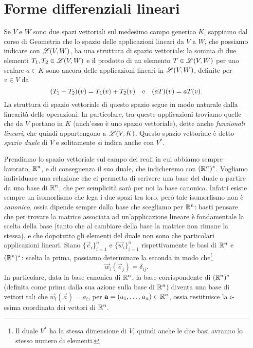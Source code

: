 \section{Forme differenziali lineari}
Se $V$ e $W$ sono due spazi vettoriali sul medesimo campo generico $K$, sappiamo dal corso di Geometria che lo spazio delle applicazioni lineari da $V$ a $W$, che possiamo indicare con $\mathscr L(V,W)$, ha una struttura di spazio vettoriale: la somma di due elementi $T_1,T_2\in\mathscr L(V,W)$ e il prodotto di un elemento $T\in\mathscr L(V,W)$ per uno scalare $a\in K$ sono ancora delle applicazioni lineari in $\mathscr L(V,W)$, definite per $v\in V$ da
\begin{equation*}
	(T_1+T_2)(v)=T_1(v)+T_2(v)\quad\text{e}\quad (aT)(v)=aT(v).
\end{equation*}
La struttura di spazio vettoriale di questo spazio segue in modo naturale dalla linearità delle operazioni.
In particolare, tra queste applicazioni troviamo quelle che da $V$ portano in $K$ (anch'esso è uno spazio vettoriale), dette anche \emph{funzionali lineari}, che quindi appartengono a $\mathscr L(V,K)$.
Questo spazio vettoriale è detto \emph{spazio duale} di $V$ e solitamente si indica anche con $V^*$.

Prendiamo lo spazio vettoriale sul campo dei reali in cui abbiamo sempre lavorato, $\mathbb{R}^n$, e di conseguenza il suo duale, che indicheremo con $(\mathbb{R}^n)^*$.
Vogliamo individuare una relazione che ci permetta di scrivere una base del duale a partire da una base di $\mathbb{R}^n$, che per semplicità sarà per noi la base canonica.
Infatti esiste sempre un isomorfismo che lega i due spazi tra loro, però tale isomorfismo non è \emph{canonico}, ossia dipende sempre dalla base che scegliamo per $\mathbb{R}^n$: basti pensare che per trovare la matrice associata ad un'applicazione lineare è fondamentale la scelta della base (tanto che al cambiare della base la matrice non rimane la stessa), e che dopotutto gli elementi del duale non sono che particolari applicazioni lineari.
Siano $\{\vec e_i\}_{i=1}^n$ e $\{\vec w_i\}_{i=1}^n$ rispettivamente le basi di $\mathbb{R}^n$ e $(\mathbb{R}^n)^*$: scelta la prima, possiamo determinare la seconda in modo che\footnote{Il duale $V^*$ ha la stessa dimensione di $V$, quindi anche le due basi avranno lo stesso numero di elementi.}
\begin{equation}
	\vec w_i(\vec e_j)=\delta_{ij}.
	\label{eq:funzionale-base-canonica}
\end{equation}
In particolare, data la base canonica di $\mathbb{R}^n$, la base corrispondente di $(\mathbb{R}^n)^*$ (definita come prima dalla sua azione sulla base di $\mathbb{R}^n$) diventa una base di vettori tali che $\vec w_i(\vec a)=a_i$, per $\mathbf{a}=(a_1,\dots,a_n)\in\mathbb{R}^n$, ossia restituisce la $i$-esima coordinata dei vettori di $\mathbb{R}^n$.

